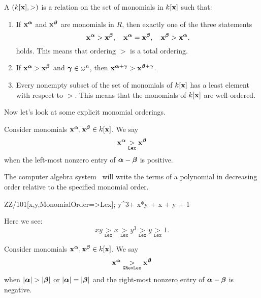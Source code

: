 \documentclass{ximera}
\begin{document}
\begin{definition}
  A  $(k[\mathbf{x}],>)$ is a relation on the set of
  monomials in $k[\mathbf{x}]$ such that:
  \begin{enumerate}
  \item If $\mathbf{x}^{{\boldsymbol\alpha}}$ and $\mathbf{x}^{{\boldsymbol\beta}}$ are
    monomials in $R$, then exactly one of the three statements
      \[
      \mathbf{x}^{{\boldsymbol\alpha}} > \mathbf{x}^{{\boldsymbol\beta}},\quad \mathbf{x}^{{\boldsymbol\alpha}} = \mathbf{x}^{{\boldsymbol\beta}},
      \quad \mathbf{x}^{{\boldsymbol\beta}} > \mathbf{x}^{{\boldsymbol\alpha}}.
      \]
      holds. This means that ordering $>$ is a total ordering.
    \item If $\mathbf{x}^{{\boldsymbol\alpha}}>\mathbf{x}^{{\boldsymbol\beta}}$ and
      ${\boldsymbol\gamma}\in\omega^n$, then
      $\mathbf{x}^{{\boldsymbol\alpha}+{\boldsymbol\gamma}}>\mathbf{x}^{{\boldsymbol\beta}+{\boldsymbol\gamma}}$.
    \item Every nonempty subset of the set of monomials of $k[\mathbf{x}]$ has
      a least element with respect to $>$. This means that the
      monomials of $k[\mathbf{x}]$ are well-ordered.
  \end{enumerate}
\end{definition}

Now let's look at some explicit monomial orderings.


\begin{definition}
  Consider monomials $\mathbf{x}^{\boldsymbol\alpha},\mathbf{x}^{\boldsymbol\beta}\in k[\mathbf{x}]$. We say
  \[
  \mathbf{x}^{\boldsymbol\alpha} \underset{\mathtt{Lex}}{>}\mathbf{x}^{\boldsymbol\beta}
  \]
  when the left-most nonzero entry of ${\boldsymbol\alpha}-{\boldsymbol\beta}$ is positive.
\end{definition}

The computer algebra system \macaulay\ will write the terms of a
polynomial in decreasing order relative to the specified monomial
order.

\begin{macaulay2}
ZZ/101[x,y,MonomialOrder=>Lex];
y^3+ x*y + x + y + 1
\end{macaulay2}

Here we see:
\[
xy \underset{\mathtt{Lex}}{>} x \underset{\mathtt{Lex}}{>} y^3
\underset{\mathtt{Lex}}{>} y \underset{\mathtt{Lex}}{>} 1.
\]



\begin{definition}
  Consider monomials $\mathbf{x}^{\boldsymbol\alpha},\mathbf{x}^{\boldsymbol\beta}\in k[\mathbf{x}]$. We say
  \[
  \mathbf{x}^{\boldsymbol\alpha} \underset{\mathtt{GRevLex}}{>}\mathbf{x}^{\boldsymbol\beta}
  \]
  when $|{\boldsymbol\alpha}| > |{\boldsymbol\beta}|$ or $|{\boldsymbol\alpha}| = |{\boldsymbol\beta}|$ and the
  right-most nonzero entry of ${\boldsymbol\alpha}-{\boldsymbol\beta}$ is negative.
\end{definition}
\end{document}
